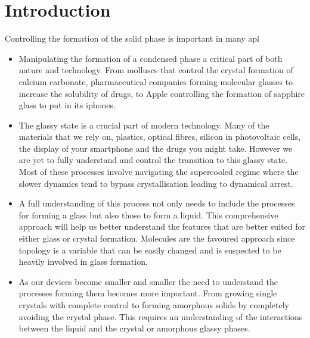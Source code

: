 
\chapter{Introduction}

Controlling the formation of the solid phase is important in many apl



\begin{itemize}

    \item Manipulating the formation of a condensed phase a critical part of both nature and technology. From molluscs that control the crystal formation of calcium carbonate, pharmaceutical companies forming molecular glasses to increase the solubility of drugs, to Apple controlling the formation of sapphire glass to put in its iphones.

    \item The glassy state is a crucial part of modern technology. Many of the materials that we rely on, plastics, optical fibres, silicon in photovoltaic cells, the display of your smartphone and the drugs you might take. However we are yet to fully understand and control the transition to this glassy state. Most of these processes involve navigating the supercooled regime where the slower dynamics tend to bypass crystallisation leading to dynamical arrest.

    \item A full understanding of this process not only needs to include the processes for forming a glass but also those to form a liquid. This comprehensive approach will help us better understand the features that are better suited for either glass or crystal formation. Molecules are the favoured approach since topology is a variable that can be easily changed and is suspected to be heavily involved in glass formation.

    \item As our devices become smaller and smaller the need to understand the processes forming them becomes more important. From growing single crystals with complete control to forming amorphous solids by completely avoiding the crystal phase. This requires an understanding of the interactions between the liquid and the crystal or amorphous glassy phases.

\end{itemize}

